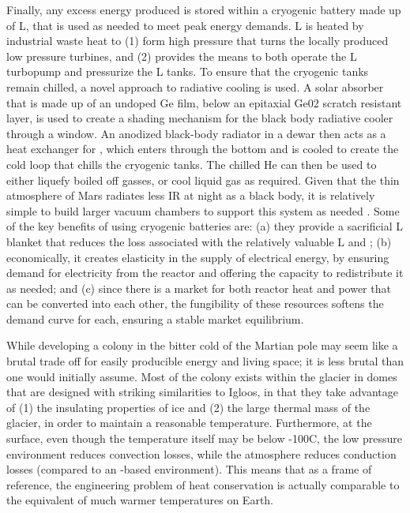 \documentclass[fleqn,10pt]{Stylesheet} %
\begin{document}
Finally, any excess energy produced is stored within a cryogenic battery \cite{Hogberg2018} made up of L, that is used as needed to meet peak energy demands. L is heated by industrial waste heat to (1) form high pressure  that turns the locally produced low pressure turbines, and (2) provides the means to both operate the L turbopump and pressurize the L tanks. To ensure that the cryogenic tanks remain chilled, a novel approach to radiative cooling is used. A solar absorber that is made up of an undoped Ge film, below an epitaxial Ge02 scratch resistant layer, is used to create a shading mechanism for the black body radiative cooler through a  window. An anodized black-body radiator in a dewar then acts as a heat exchanger for , which enters through the bottom and is cooled to create the cold loop that chills the cryogenic tanks. The chilled He can then be used to either liquefy boiled off gasses, or cool liquid gas as required. Given that the thin atmosphere of Mars radiates less IR at night as a black body, it is relatively simple to build larger vacuum chambers to support this system as needed \cite{Chen2019}. Some of the key benefits of using cryogenic batteries are: (a) they provide a sacrificial L blanket that reduces the loss associated with the relatively valuable L and ; (b) economically, it creates elasticity in the supply of electrical energy, by ensuring demand for electricity from the reactor and offering the capacity to redistribute it as needed; and (c) since there is a market for both reactor heat and power that can be converted into each other, the fungibility of these resources softens the demand curve for each, ensuring a stable market equilibrium.

While developing a colony in the bitter cold of the Martian pole may seem like a brutal trade off for easily producible energy and living space; it is less brutal than one would initially assume. Most of the colony exists within the glacier in domes that are designed with striking similarities to Igloos, in that they take advantage of (1) the insulating properties of ice and (2) the large thermal mass of the glacier, in order to maintain a reasonable temperature. Furthermore, at the surface, even though the temperature itself may be below -100\degree{}C, the low pressure environment reduces convection losses, while the  atmosphere reduces conduction losses (compared to an -based environment). This means that as a frame of reference, the engineering problem of heat conservation is actually comparable to the equivalent of much warmer temperatures on Earth.
\end{document}

